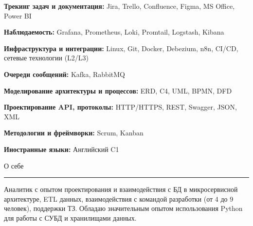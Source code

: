 \documentclass[14pt, a4paper, oneside]{extarticle}
\begin{document}
\textbf{Трекинг задач и документация:} Jira, Trello, Confluence, Figma, MS Office, Power BI

\textbf{Наблюдаемость:} Grafana, Prometheus, Loki, Promtail, Logstash, Kibana

\textbf{Инфраструктура и интеграции:} Linux, Git, Docker, Debezium, n8n, CI/CD, сетевые технологии (L2/L3)

\textbf{Очереди сообщений:} Kafka, RabbitMQ

\textbf{Моделирование архитектуры и процессов:}  ERD, C4, UML, BPMN, DFD

\textbf{Проектирование API, протоколы:} HTTP/HTTPS, REST, Swagger, JSON, XML

\textbf{Методологии и фреймворки:} Scrum, Kanban

\textbf{Иностранные языки:} Английский C1


\begin{flushleft}
	\vspace{-\intextsep}
	\large О себе
\end{flushleft}

\vspace{-0.8\intextsep}
\hrule

\begin{sloppypar}
	\vspace{0.5\intextsep}
	\quad
	Аналитик с опытом проектирования и взаимодействия с БД в микросервисной архитектуре, ETL данных, взаимодействия с командой разработки (от 4 до 9 человек), поддержки ТЗ. Обладаю значительным опытом использования Python для работы с СУБД и хранилищами данных. 
\end{sloppypar}
\end{document}

